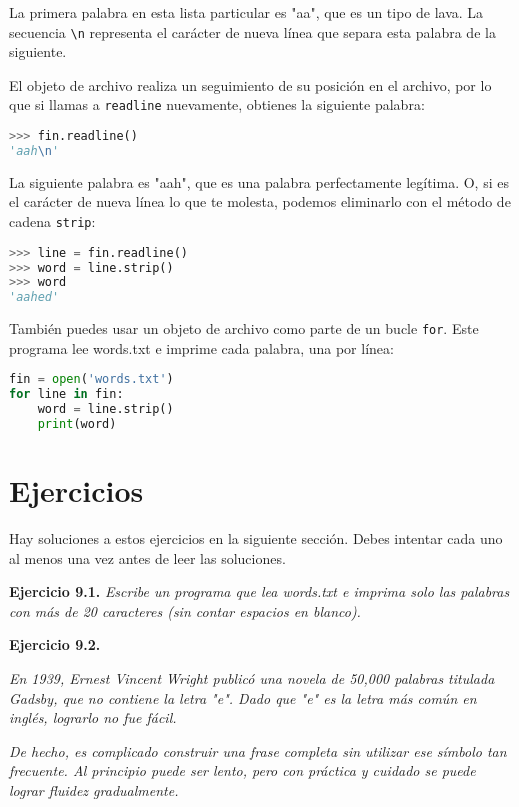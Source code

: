La primera palabra en esta lista particular es "aa", que es un tipo de lava. La secuencia \texttt{\textbackslash n} representa el carácter de nueva línea que separa esta palabra de la siguiente.

El objeto de archivo realiza un seguimiento de su posición en el archivo, por lo que si llamas a \texttt{readline} nuevamente, obtienes la siguiente palabra:

\begin{lstlisting}[language=Python]
>>> fin.readline()
'aah\n'
\end{lstlisting}

La siguiente palabra es "aah", que es una palabra perfectamente legítima. O, si es el carácter de nueva línea lo que te molesta, podemos eliminarlo con el método de cadena \texttt{strip}:

\begin{lstlisting}[language=Python]
>>> line = fin.readline()
>>> word = line.strip()
>>> word
'aahed'
\end{lstlisting}

También puedes usar un objeto de archivo como parte de un bucle \texttt{for}. Este programa lee words.txt e imprime cada palabra, una por línea:

\begin{lstlisting}[language=Python]
fin = open('words.txt')
for line in fin:
    word = line.strip()
    print(word)
\end{lstlisting}

\section{Ejercicios}

Hay soluciones a estos ejercicios en la siguiente sección. Debes intentar cada uno al menos una vez antes de leer las soluciones.

\textbf{Ejercicio 9.1.} \textit{Escribe un programa que lea words.txt e imprima solo las palabras con más de 20 caracteres (sin contar espacios en blanco).}

\textbf{Ejercicio 9.2.} 

\textit{En 1939, Ernest Vincent Wright publicó una novela de 50,000 palabras titulada \textit{Gadsby}, que no contiene la letra "e". Dado que "e" es la letra más común en inglés, lograrlo no fue fácil.}

\textit{De hecho, es complicado construir una frase completa sin utilizar ese símbolo tan frecuente. Al principio puede ser lento, pero con práctica y cuidado se puede lograr fluidez gradualmente.}

